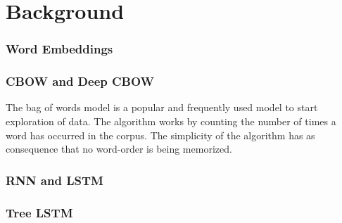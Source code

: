 \section{Background}
\label{sec: background}
\subsubsection{Word Embeddings}
\subsubsection{CBOW and Deep CBOW}
The bag of words model is a popular and frequently used model to start
exploration of data. The algorithm works by counting the number of times a word
has occurred in the corpus. The simplicity of the algorithm has as consequence
that no word-order is being memorized.

\subsubsection{RNN and LSTM}
\subsubsection{Tree LSTM}
